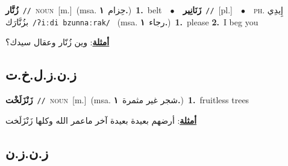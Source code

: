 \documentclass[10pt,a4paper,twoside]{article} %
\begin{document}
\begin{multicols}{2}
{\setlength\topsep{0pt}\textbf{\foreignlanguage{arabic}{زُنَّار}}\ {\color{gray}\texttt{//}\color{black}}\ \textsc{noun}\ [m.]\ \color{gray}(msa. \foreignlanguage{arabic}{حِزام}~\foreignlanguage{arabic}{\textbf{١.}})\color{black}\ \textbf{1.}~belt\ \ $\bullet$\ \ \setlength\topsep{0pt}\textbf{\foreignlanguage{arabic}{زَنَانِير}}\ {\color{gray}\texttt{//}\color{black}}\ [pl.]\ \ $\bullet$\ \ \textsc{ph.} \color{gray} \foreignlanguage{arabic}{إِيدِي بزُنَّارَك}\color{black}\ {\color{gray}\texttt{/{\sffamily ʔiːdi bzunnaːrak}/}\color{black}}\ \color{gray} (msa. \foreignlanguage{arabic}{رجاء}~\foreignlanguage{arabic}{\textbf{١.}})\color{black}\ \textbf{1.}~please  \textbf{2.}~I beg you\  \begin{flushright}\color{gray}\foreignlanguage{arabic}{\textbf{\underline{\foreignlanguage{arabic}{أمثلة}}}: وين زُنّار وعقال سيدك؟}\end{flushright}\color{black}} \vspace{2mm}

\vspace{-3mm}
\subsection*{\color{blue}\foreignlanguage{arabic}{ز.ن.ز.ل.خ.ت}\color{blue}{ (ntws)}} 

{\setlength\topsep{0pt}\textbf{\foreignlanguage{arabic}{زَنْزَلَخْت}}\ {\color{gray}\texttt{//}\color{black}}\ \textsc{noun}\ [m.]\ \color{gray}(msa. \foreignlanguage{arabic}{شجر غير مثمرة}~\foreignlanguage{arabic}{\textbf{١.}})\color{black}\ \textbf{1.}~fruitless trees\  \begin{flushright}\color{gray}\foreignlanguage{arabic}{\textbf{\underline{\foreignlanguage{arabic}{أمثلة}}}: أرضهم بعيدة بعيدة آخر ماعمر الله وكلها زَنْزَلَخت}\end{flushright}\color{black}} \vspace{2mm}

\vspace{-3mm}
\subsection*{\color{blue}\foreignlanguage{arabic}{ز.ن.ز.ن}\color{blue}{}} 


\end{multicols}
\end{document}
